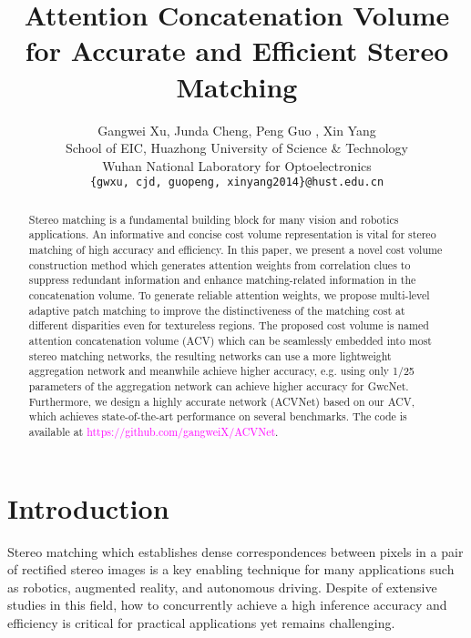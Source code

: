 \documentclass[10pt,twocolumn,letterpaper]{article}
\begin{document}
\title{Attention Concatenation Volume for Accurate and Efficient Stereo Matching}

\author{
Gangwei Xu\footnotemark[1] ,  Junda Cheng\footnotemark[1] ,  Peng Guo ,  Xin Yang\footnotemark[2]\\
School of EIC, Huazhong University of Science \& Technology\\
Wuhan National Laboratory for Optoelectronics\\
{\tt\small \{gwxu, cjd, guopeng, xinyang2014\}@hust.edu.cn}
}



\maketitle

\begin{abstract}
Stereo matching is a fundamental building block for many vision and robotics applications. An informative and concise cost volume representation is vital for stereo matching of high accuracy and efficiency.
In this paper, we present a novel cost volume construction method which generates attention weights from correlation clues to suppress redundant information and enhance matching-related information in the concatenation volume. To generate reliable attention weights, we propose multi-level adaptive patch matching to improve the distinctiveness of the matching cost at different disparities even for textureless regions. The proposed cost volume is named attention concatenation volume (ACV) which can be seamlessly embedded into most stereo matching networks, the resulting networks can use a more lightweight aggregation network and meanwhile achieve higher accuracy, e.g. using only 1/25 parameters of the aggregation network can achieve higher accuracy for GwcNet. Furthermore, we design a highly accurate network (ACVNet) based on our ACV, which
achieves state-of-the-art performance
on several benchmarks. 
The code is available at \textcolor{magenta}{https://github.com/gangweiX/ACVNet}.
\end{abstract}
{
\renewcommand{\thefootnote}{\fnsymbol{footnote}}
}

\section{Introduction}
\label{sec:intro}
Stereo matching which establishes dense correspondences between pixels in a pair of rectified stereo images is a key enabling technique for many applications such as robotics, augmented reality, and autonomous driving. Despite of extensive studies in this field, 
how to concurrently achieve a high inference accuracy and efficiency is critical for practical applications yet remains challenging.
\end{document}
